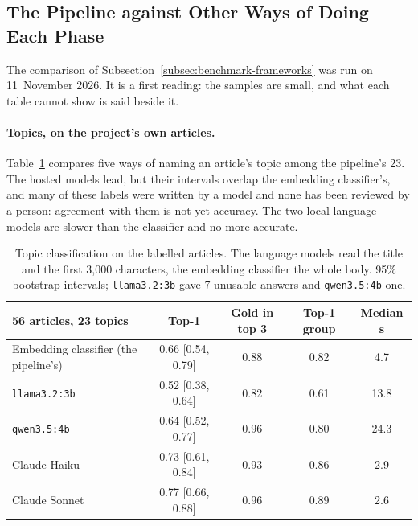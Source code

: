 
\subsection{The Pipeline against Other Ways of Doing Each Phase}
\label{subsec:results-frameworks}

The comparison of Subsection~\ref{subsec:benchmark-frameworks} was run
on 11~November 2026. It is a first reading: the samples are small, and
what each table cannot show is said beside it.

\paragraph{Topics, on the project's own articles.}
Table~\ref{tab:frameworks-topics} compares five ways of naming an
article's topic among the pipeline's 23. The hosted models lead, but
their intervals overlap the embedding classifier's, and many of these
labels were written by a model and none has been reviewed by a person:
agreement with them is not yet accuracy. The two local language models
are slower than the classifier and no more accurate.

\begin{table}[ht]
\centering
\small
\begin{tabular}{@{}lcccc@{}}
\toprule
56 articles, 23 topics & Top-1 & Gold in top 3 & Top-1 group & Median s \\
\midrule
Embedding classifier (the pipeline's) & 0.66 [0.54, 0.79] & 0.88 & 0.82 & 4.7 \\
\texttt{llama3.2:3b} & 0.52 [0.38, 0.64] & 0.82 & 0.61 & 13.8 \\
\texttt{qwen3.5:4b} & 0.64 [0.52, 0.77] & 0.96 & 0.80 & 24.3 \\
Claude Haiku & 0.73 [0.61, 0.84] & 0.93 & 0.86 & 2.9 \\
Claude Sonnet & 0.77 [0.66, 0.88] & 0.96 & 0.89 & 2.6 \\
\bottomrule
\end{tabular}
\caption[Topic classification on the project's articles]{Topic
classification on the labelled articles. The language models read the
title and the first 3{,}000 characters, the embedding classifier the
whole body. 95\% bootstrap intervals; \texttt{llama3.2:3b} gave 7
unusable answers and \texttt{qwen3.5:4b} one.}
\label{tab:frameworks-topics}
\end{table}

